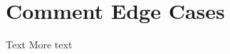 \documentclass{article}
\begin{document}
\section{Comment Edge Cases}
Text %
More text %
\end{document}
